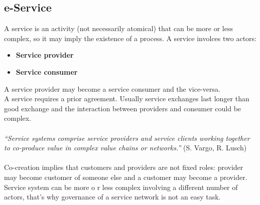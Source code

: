 \documentclass[10pt,a4paper]{article}
\begin{document}
\subsection{e-Service}
A service is an activity (not necessarily atomical) that can be more or less complex, so it may imply the existence of a process. A service involces two actors: 
\begin{itemize}
	\item \textbf{Service provider}
	\item \textbf{Service consumer}
\end{itemize}
A service provider may become a service consumer and the vice-versa. \\ 
A service requires a prior agreement. Usually service exchanges last longer than good exchange and the interaction between providers and consumer could be complex. \\ \\
\textit{“Service systems comprise service providers and service clients working together to co-produce value in complex value chains or networks.”} (S. Vargo, R. Lusch)\\ \\
Co-creation implies that customers and providers are not fixed roles: provider may become customer of someone else and a customer may become a provider. \\
Service system can be more o r less complex involving a different number of actors, that's why governance of a service network is not an easy task.
\end{document}
